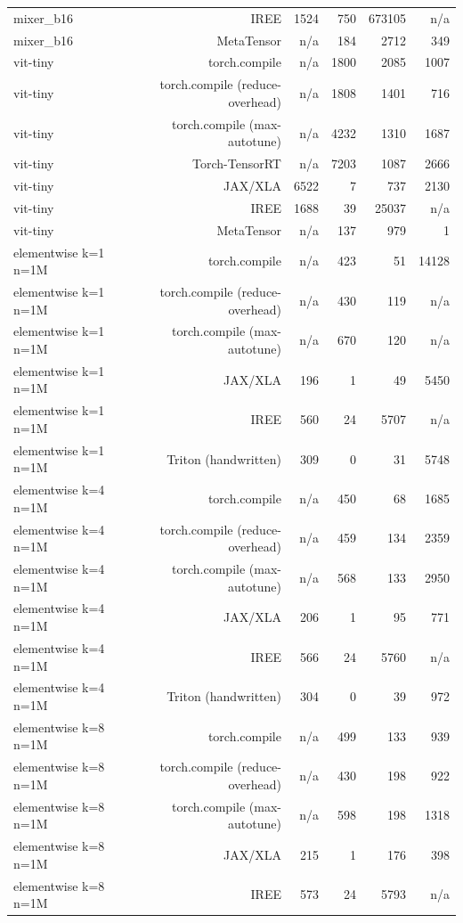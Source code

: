 \begin{tabular}{lrrrrr}
mixer\_b16 & IREE & 1524 & 750 & 673105 & n/a \\
mixer\_b16 & MetaTensor & n/a & 184 & 2712 & 349 \\
vit-tiny & torch.compile & n/a & 1800 & 2085 & 1007 \\
vit-tiny & torch.compile (reduce-overhead) & n/a & 1808 & 1401 & 716 \\
vit-tiny & torch.compile (max-autotune) & n/a & 4232 & 1310 & 1687 \\
vit-tiny & Torch-TensorRT & n/a & 7203 & 1087 & 2666 \\
vit-tiny & JAX/XLA & 6522 & 7 & 737 & 2130 \\
vit-tiny & IREE & 1688 & 39 & 25037 & n/a \\
vit-tiny & MetaTensor & n/a & 137 & 979 & 1 \\
elementwise k=1 n=1M & torch.compile & n/a & 423 & 51 & 14128 \\
elementwise k=1 n=1M & torch.compile (reduce-overhead) & n/a & 430 & 119 & n/a \\
elementwise k=1 n=1M & torch.compile (max-autotune) & n/a & 670 & 120 & n/a \\
elementwise k=1 n=1M & JAX/XLA & 196 & 1 & 49 & 5450 \\
elementwise k=1 n=1M & IREE & 560 & 24 & 5707 & n/a \\
elementwise k=1 n=1M & Triton (handwritten) & 309 & 0 & 31 & 5748 \\
elementwise k=4 n=1M & torch.compile & n/a & 450 & 68 & 1685 \\
elementwise k=4 n=1M & torch.compile (reduce-overhead) & n/a & 459 & 134 & 2359 \\
elementwise k=4 n=1M & torch.compile (max-autotune) & n/a & 568 & 133 & 2950 \\
elementwise k=4 n=1M & JAX/XLA & 206 & 1 & 95 & 771 \\
elementwise k=4 n=1M & IREE & 566 & 24 & 5760 & n/a \\
elementwise k=4 n=1M & Triton (handwritten) & 304 & 0 & 39 & 972 \\
elementwise k=8 n=1M & torch.compile & n/a & 499 & 133 & 939 \\
elementwise k=8 n=1M & torch.compile (reduce-overhead) & n/a & 430 & 198 & 922 \\
elementwise k=8 n=1M & torch.compile (max-autotune) & n/a & 598 & 198 & 1318 \\
elementwise k=8 n=1M & JAX/XLA & 215 & 1 & 176 & 398 \\
elementwise k=8 n=1M & IREE & 573 & 24 & 5793 & n/a \\

\end{tabular}
